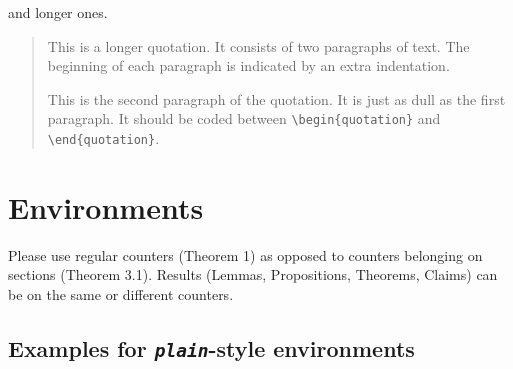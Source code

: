\documentclass[qe,nameyear,draft]{econsocart}
\theoremstyle{plain}
\begin{document}
and longer ones.


\begin{quotation}
This is a longer quotation.  It consists of two paragraphs
of text.  The beginning of each paragraph is indicated
by an extra indentation.

This is the second paragraph of the quotation.  It is just
as dull as the first paragraph. It should be coded between \verb|\begin{quotation}| and \verb|\end{quotation}|.
\end{quotation}
\section{Environments}

Please use regular counters (Theorem 1) as opposed to counters belonging on sections (Theorem 3.1). Results (Lemmas, Propositions, Theorems, Claims) can be on the same or different counters.

\subsection{Examples for \textit{\texttt{plain}}-style environments}
\end{document}

